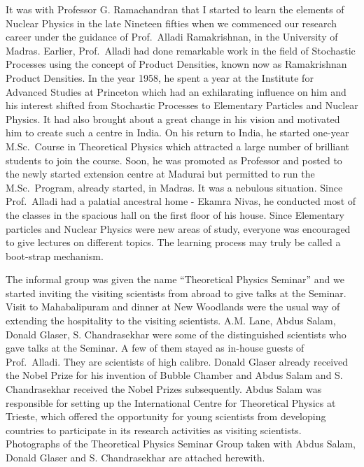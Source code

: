 It was with Professor G. Ramachandran that I started to learn the elements of Nuclear Physics in the late Nineteen fifties when we commenced our research career \cite{chap3-key1,chap3-key2,chap3-key3,chap3-key4,chap3-key5,chap3-key6,chap3-key7,chap3-key8} under the guidance of Prof.\ Alladi Ramakrishnan, in the University of Madras. Earlier, Prof.\ Alladi had done remarkable work in the field of Stochastic Processes using the concept of Product Densities, known now as Ramakrishnan Product Densities. In the year 1958, he spent a year at the Institute for Advanced Studies at Princeton which had an exhilarating influence on him and his interest shifted from Stochastic Processes to Elementary Particles and Nuclear Physics. It had also brought about a great change in his vision and motivated him to create such a centre in India. On his return to India, he started one-year M.Sc.\ Course in Theoretical Physics which attracted a large number of brilliant students to join the course. Soon, he was promoted as Professor and posted to the newly started extension centre at Madurai but permitted to run the M.Sc.\ Program, already started, in Madras. It was a nebulous situation. Since Prof.\ Alladi had a palatial ancestral home - Ekamra Nivas, he conducted most of the classes in the spacious hall on the first floor of his house. Since Elementary particles and Nuclear Physics were new areas of study, everyone was encouraged to give lectures on different topics. The learning process may truly be called a boot-strap mechanism.

The informal group was given the name “Theoretical Physics Seminar” and we started inviting the visiting scientists from abroad to give talks at the Seminar. Visit to Mahabalipuram and dinner at New Woodlands were the usual way of extending the hospitality to the visiting scientists. A.M. Lane, Abdus Salam, Donald Glaser, S. Chandrasekhar were some of the distinguished scientists who gave talks at the Seminar. A few of them stayed as in-house guests of Prof.\ Alladi. They are scientists of high calibre. Donald Glaser already received the Nobel Prize for his invention of Bubble Chamber and Abdus Salam and S. Chandrasekhar received the Nobel Prizes subsequently. Abdus Salam was responsible for setting up the International Centre for Theoretical Physics at Trieste, which offered the opportunity for young scientists from developing countries to participate in its research activities as visiting scientists. Photographs of the Theoretical Physics Seminar Group taken with Abdus Salam, Donald Glaser and S. Chandrasekhar are attached herewith.

